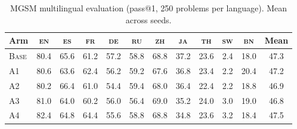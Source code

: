 \begin{table}[t]
\centering\small
\caption{MGSM multilingual evaluation (pass@1, 250 problems per language). Mean across seeds.}
\label{tab:mgsm}
\begin{tabular}{lccccccccccc}
\toprule
Arm & \textsc{en} & \textsc{es} & \textsc{fr} & \textsc{de} & \textsc{ru} & \textsc{zh} & \textsc{ja} & \textsc{th} & \textsc{sw} & \textsc{bn} & Mean \\
\midrule
\textsc{Base} & 80.4 & 65.6 & 61.2 & 57.2 & 58.8 & 68.8 & 37.2 & 23.6 & 2.4 & 18.0 & 47.3 \\
\textsc{A1} & 80.6 & 63.6 & 62.4 & 56.2 & 59.2 & 67.6 & 36.8 & 23.4 & 2.2 & 20.4 & 47.2 \\
\textsc{A2} & 80.2 & 66.4 & 61.0 & 54.4 & 59.4 & 68.0 & 36.4 & 22.4 & 2.2 & 18.8 & 46.9 \\
\textsc{A3} & 81.0 & 64.0 & 60.2 & 56.0 & 56.4 & 69.0 & 35.2 & 24.0 & 3.0 & 19.0 & 46.8 \\
\textsc{A4} & 82.4 & 64.8 & 64.4 & 55.6 & 58.8 & 68.8 & 34.8 & 23.6 & 3.2 & 18.4 & 47.5 \\
\bottomrule
\end{tabular}
\end{table}